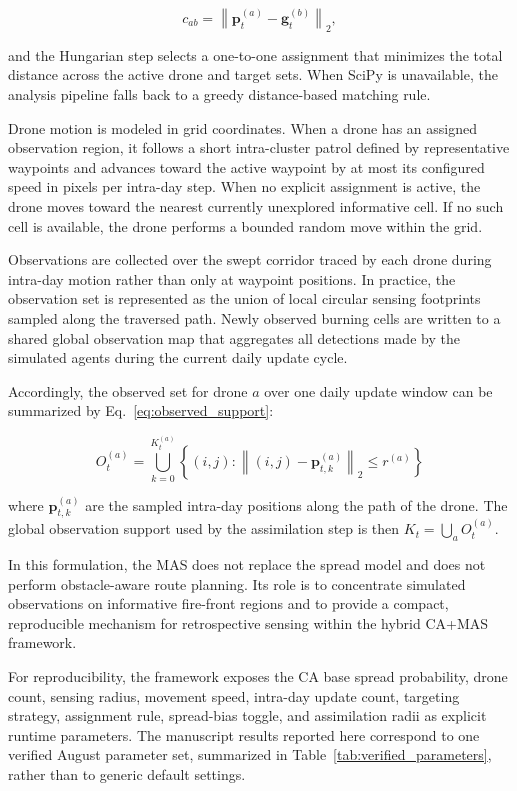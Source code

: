 \documentclass[10pt,letterpaper]{article}
\begin{document}
\begin{equation}
c_{ab}=\left\|\mathbf{p}_t^{(a)}-\mathbf{g}_t^{(b)}\right\|_2,
\label{eq:assignment_cost}
\end{equation}

and the Hungarian step selects a one-to-one assignment that minimizes
the total distance across the active drone and target sets. When SciPy
is unavailable, the analysis pipeline falls back to a greedy distance-based
matching rule.

Drone motion is modeled in grid coordinates. When a drone has an
assigned observation region, it follows a short intra-cluster patrol
defined by representative waypoints and advances toward the active
waypoint by at most its configured speed in pixels per intra-day step.
When no explicit assignment is active, the drone moves toward the
nearest currently unexplored informative cell. If no such cell is
available, the drone performs a bounded random move within the grid.

Observations are collected over the swept corridor traced by each drone
during intra-day motion rather than only at waypoint positions. In
practice, the observation set is represented as the union of local
circular sensing footprints sampled along the traversed path. Newly
observed burning cells are written to a shared global observation map
that aggregates all detections made by the simulated agents during the
current daily update cycle.

Accordingly, the observed set for drone $a$ over one daily update window
can be summarized by Eq.~\ref{eq:observed_support}:

\begin{equation}
O_t^{(a)}=\bigcup_{k=0}^{K_t^{(a)}} \left\{(i,j):
\left\|(i,j)-\mathbf{p}_{t,k}^{(a)}\right\|_2 \le r^{(a)}\right\}
\label{eq:observed_support}
\end{equation}

where $\mathbf{p}_{t,k}^{(a)}$ are the sampled intra-day positions along
the path of the drone. The global observation support used by the
assimilation step is then $K_t=\bigcup_a O_t^{(a)}$.

In this formulation, the MAS does not replace the spread model and
does not perform obstacle-aware route planning. Its role is to
concentrate simulated observations on informative fire-front regions and
to provide a compact, reproducible mechanism for retrospective sensing
within the hybrid CA+MAS framework.

For reproducibility, the framework exposes the CA base spread
probability, drone count, sensing radius, movement speed, intra-day
update count, targeting strategy, assignment rule, spread-bias toggle,
and assimilation radii as explicit runtime parameters. The manuscript
results reported here correspond to one verified August parameter set,
summarized in Table~\ref{tab:verified_parameters}, rather than to
generic default settings.
\end{document}
